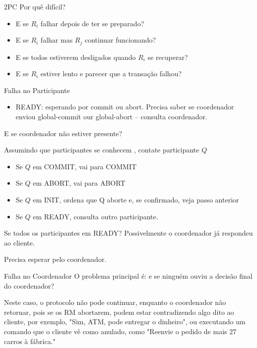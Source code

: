 \begin{frame}{2PC}
Por quê difícil?
\begin{itemize}
	\item E se $R_i$ falhar depois de ter se preparado?\pause
	\item E se $R_i$ falhar mas $R_j$ continuar funcionando?\pause
	\item E se todos estiverem desligados quando $R_i$ se recuperar?\pause
	\item E se $R_i$ estiver lento e parecer que a transação falhou?
\end{itemize}
\end{frame}


\begin{frame}{Falha no Participante}
\begin{itemize}
	\item READY: esperando por commit ou abort. Precisa saber se coordenador enviou global-commit our global-abort -- consulta coordenador.
\end{itemize}
	\alert{E se coordenador não estiver presente?} \pause 
	
Assumindo que participantes se conhecem \pause , contate participante $Q$	
	\begin{itemize}
		\item Se $Q$ em COMMIT\pause , vai para COMMIT
		\item Se $Q$ em ABORT\pause , vai para ABORT
		\item Se $Q$ em INIT\pause , ordena que Q aborte e, se confirmado, veja passo anterior
		\item Se $Q$ em READY\pause , consulta outro participante.
	\end{itemize}
\pause \alert{Se todos os participantes em READY?} \pause Possivelmente o coordenador já respondeu ao cliente.

\pause\alert{Precisa} esperar pelo coordenador.
\end{frame}

\begin{frame}{Falha no Coordenador}
O problema principal é: e se ninguém ouviu a decisão final do coordenador?

Neste caso, \pause o protocolo não pode continuar, enquanto o coordenador não retornar, pois se os RM abortarem, podem estar contradizendo algo dito ao cliente, por exemplo, "Sim, ATM, pode entregar o dinheiro", ou executando um comando que o cliente vê como anulado, como "Reenvie o pedido de mais 27 carros à fábrica."
\end{frame}

